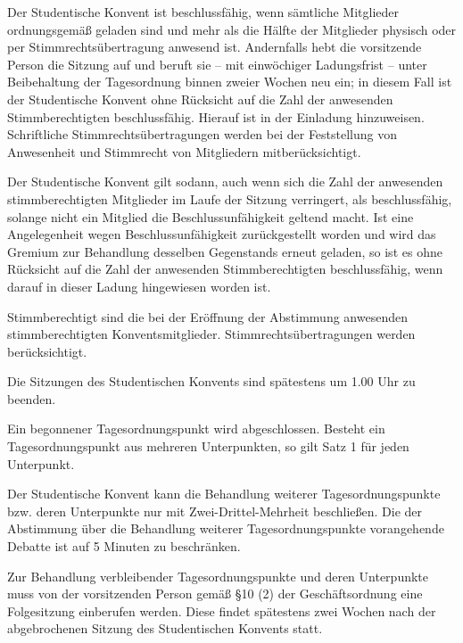 \documentclass[10pt,a4paper]{scrartcl}
\begin{document}
\begin{contract}
  Der Studentische Konvent ist beschlussfähig, wenn sämtliche Mitglieder
  ordnungsgemäß geladen sind und mehr als die Hälfte der Mitglieder
  physisch oder per Stimmrechtsübertragung anwesend ist. Andernfalls
  hebt die vorsitzende Person die Sitzung auf und beruft sie -- mit
  einwöchiger Ladungsfrist -- unter Beibehaltung der Tagesordnung binnen
  zweier Wochen neu ein; in diesem Fall ist der Studentische Konvent
  ohne Rücksicht auf die Zahl der anwesenden Stimmberechtigten
  beschlussfähig. Hierauf ist in der Einladung hinzuweisen. Schriftliche
  Stimmrechtsübertragungen werden bei der Feststellung von Anwesenheit
  und Stimmrecht von Mitgliedern mitberücksichtigt.

  Der Studentische Konvent gilt sodann, auch wenn sich die Zahl der
  anwesenden stimmberechtigten Mitglieder im Laufe der Sitzung
  verringert, als beschlussfähig, solange nicht ein Mitglied die
  Beschlussunfähigkeit geltend macht. Ist eine Angelegenheit wegen
  Beschlussunfähigkeit zurückgestellt worden und wird das Gremium zur
  Behandlung desselben Gegenstands erneut geladen, so ist es ohne
  Rücksicht auf die Zahl der anwesenden Stimmberechtigten
  beschlussfähig, wenn darauf in dieser Ladung hingewiesen worden ist.

  Stimmberechtigt sind die bei der Eröffnung der Abstimmung anwesenden
  stimmberechtigten Konventsmitglieder. Stimmrechtsübertragungen werden
  berücksichtigt.



\label{dauer-der-sitzungen}




  Die Sitzungen des Studentischen Konvents sind spätestens um 1.00 Uhr
  zu beenden.

  Ein begonnener Tagesordnungspunkt wird abgeschlossen. Besteht ein
  Tagesordnungspunkt aus mehreren Unterpunkten, so gilt Satz 1 für jeden
  Unterpunkt.

  Der Studentische Konvent kann die Behandlung weiterer
  Tagesordnungspunkte bzw. deren Unterpunkte nur mit
  Zwei-Drittel-Mehrheit beschließen. Die der Abstimmung über die
  Behandlung weiterer Tagesordnungspunkte vorangehende Debatte ist auf 5
  Minuten zu beschränken.

  Zur Behandlung verbleibender Tagesordnungspunkte und deren Unterpunkte
	muss von der vorsitzenden Person gemäß §10 (2) der Geschäftsordnung eine
  Folgesitzung einberufen werden. Diese findet spätestens zwei Wochen
  nach der abgebrochenen Sitzung des Studentischen Konvents statt.


\end{contract}
\end{document}
